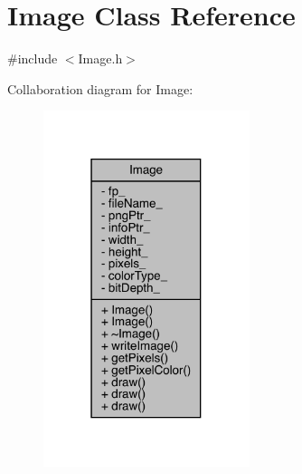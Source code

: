 \hypertarget{class_image}{}\section{Image Class Reference}
\label{class_image}


{\ttfamily \#include $<$Image.\+h$>$}



Collaboration diagram for Image\+:
\nopagebreak
\begin{figure}[H]
\begin{center}
\leavevmode
\includegraphics[width=171pt]{class_image__coll__graph}
\end{center}
\end{figure}
